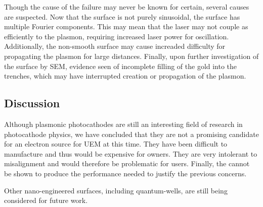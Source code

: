 Though the cause of the failure may never be known for certain, several causes are suspected.
Now that the surface is not purely sinusoidal, the surface has multiple Fourier components.
This may mean that the laser may not couple as efficiently to the plasmon, requiring increased laser power for oscillation. 
Additionally, the non-smooth surface may cause increaded difficulty for propagating the plasmon for large distances.
Finally, upon further investigation of the surface by SEM, evidence seen of incomplete filling of the gold into the trenches, which may have interrupted creation or propagation of the plasmon.

\subsection{Discussion}

Although plasmonic photocathodes are still an interesting field of research in photocathode physics, we have concluded that they are not a promising candidate for an electron source for UEM at this time.
They have been difficult to manufacture and thus would be expensive for owners.
They are very intolerant to misalignment and would therefore be problematic for users.
Finally, the cannot be shown to produce the performance needed to justify the previous concerns.

Other nano-engineered surfaces, including quantum-wells, are still being considered for future work.

